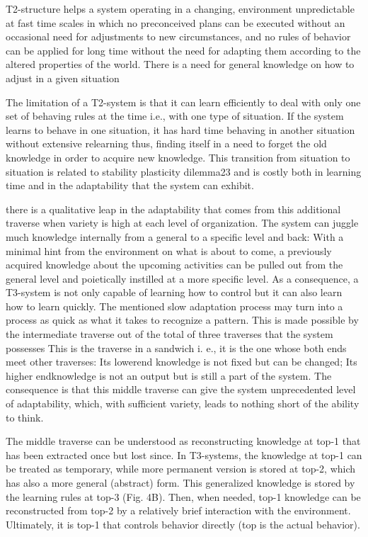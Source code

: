 \documentclass[10pt,a4paper]{article}
\begin{document}
T2-structure helps a system operating in a changing, environment
unpredictable at fast time scales in which no preconceived
plans can be executed without an occasional need for adjustments
to new circumstances, and no rules of behavior can be applied for
long time without the need for adapting them according to the
altered properties of the world. There is a need for general
knowledge on how to adjust in a given situation

The limitation of a T2-system is that it can learn efficiently to
deal with only one set of behaving rules at the time i.e., with one
type of situation. If the system learns to behave in one situation, it
has hard time behaving in another situation without extensive
relearning thus, finding itself in a need to forget the old knowledge
in order to acquire new knowledge. This transition from situation
to situation is related to stability plasticity dilemma23 and is costly
both in learning time and in the adaptability that the system can
exhibit.

there is a qualitative leap in the
adaptability that comes from this additional traverse when variety
is high at each level of organization. The system can juggle much
knowledge internally from a general to a specific level and back:
With a minimal hint from the environment on what is about to
come, a previously acquired knowledge about the upcoming
activities can be pulled out from the general level and poietically
instilled at a more specific level.
As a consequence, a T3-system is not only capable of learning
how to control but it can also learn how to learn quickly. The
mentioned slow adaptation process may turn into a process as
quick as what it takes to recognize a pattern. This is made possible
by the intermediate traverse out of the total of three traverses that
the system possesses
This is the traverse in a sandwich i.
e., it is the one whose both ends meet other traverses: Its lowerend
knowledge is not fixed but can be changed; Its higher endknowledge
is not an output but is still a part of the system. The
consequence is that this middle traverse can give the system
unprecedented level of adaptability, which, with sufficient variety,
leads to nothing short of the ability to think.


The middle traverse can be understood as reconstructing
knowledge at top-1 that has been extracted once but lost since.
In T3-systems, the knowledge at top-1 can be treated as temporary,
while more permanent version is stored at top-2, which has
also a more general (abstract) form. This generalized knowledge
is stored by the learning rules at top-3 (Fig. 4B). Then, when
needed, top-1 knowledge can be reconstructed from top-2 by a
relatively brief interaction with the environment. Ultimately, it is
top-1 that controls behavior directly (top is the actual behavior).
\end{document}
